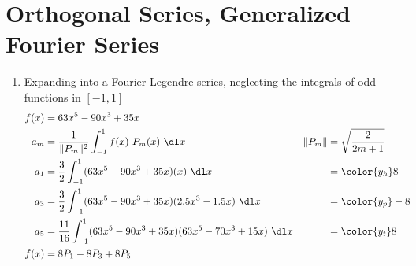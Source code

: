 \section{Orthogonal Series, Generalized Fourier Series}

\begin{enumerate}
    \item Expanding into a Fourier-Legendre series, neglecting the integrals of odd
          functions in $ [-1, 1] $
          \begin{align}
              f(x)                              & = 63x^5  - 90x^3 + 35x          \\
              a_m                               & = \frac{1}{\lVert P_m \rVert^2}
              \int_{-1}^{1} f(x)\ P_m(x)\ \dl x &
              \lVert P_m \rVert                 & = \sqrt{\frac{2}{2m + 1}}       \\
              a_1                               & = \frac{3}{2} \int_{-1}^{1}
              (63x^5 - 90x^3 + 35x)(x)\ \dl x   &
                                                & = \color{y_h} 8                 \\
              a_3                               & = \frac{3}{2} \int_{-1}^{1}
              (63x^5 - 90x^3 + 35x)(2.5x^3 - 1.5x)
              \ \dl x                           &
                                                & =  \color{y_p} -8               \\
              a_5                               & = \frac{11}{16} \int_{-1}^{1}
              (63x^5 - 90x^3 + 35x)(63x^5 - 70x^3 + 15x)
              \ \dl x                           &
                                                & =  \color{y_t} 8                \\
              f(x)                              & = 8P_1 - 8P_3 + 8P_5
          \end{align}


\end{enumerate}
